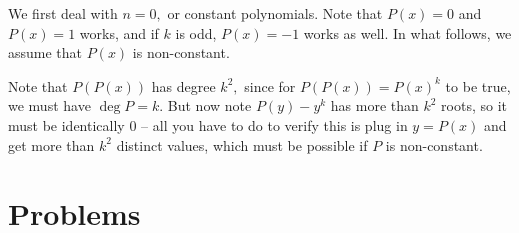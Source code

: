 \documentclass{article}
\begin{document}
\begin{sol}
We first deal with $n=0,$ or constant polynomials. Note that $P(x)=0$ and $P(x)=1$ works, and if $k$ is odd, $P(x)=-1$ works as well. In what follows, we assume that $P(x)$ is non-constant.

Note that $P(P(x))$ has degree $k^2,$ since for $P(P(x))=P(x)^k$ to be true, we must have $\deg P = k.$ But now note $P(y)-y^k$ has more than $k^2$ roots, so it must be identically $0$ -- all you have to do to verify this is plug in $y=P(x)$ and get more than $k^2$ distinct values, which must be possible if $P$ is non-constant.
\end{sol}

\pagebreak

\section{Problems}


\end{document}

